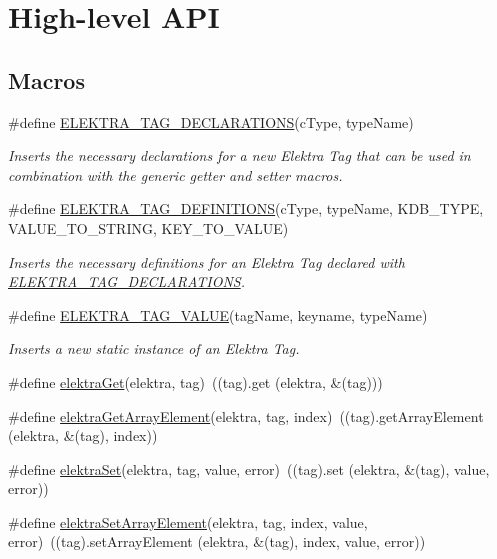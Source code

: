 \hypertarget{group__highlevel}{}\section{High-\/level A\+PI}
\label{group__highlevel}
\subsection*{Macros}
\begin{DoxyCompactItemize}
\item 
\#define \hyperlink{group__highlevel_gad2b8a6e7493d6128d38d9ac68906fb62}{E\+L\+E\+K\+T\+R\+A\+\_\+\+T\+A\+G\+\_\+\+D\+E\+C\+L\+A\+R\+A\+T\+I\+O\+NS}(c\+Type,  type\+Name)
\begin{DoxyCompactList}\small\item\em Inserts the necessary declarations for a new Elektra Tag that can be used in combination with the generic getter and setter macros. \end{DoxyCompactList}\item 
\#define \hyperlink{group__highlevel_ga02481adffa727707a6b0fcf3842b6c95}{E\+L\+E\+K\+T\+R\+A\+\_\+\+T\+A\+G\+\_\+\+D\+E\+F\+I\+N\+I\+T\+I\+O\+NS}(c\+Type,  type\+Name,  K\+D\+B\+\_\+\+T\+Y\+PE,  V\+A\+L\+U\+E\+\_\+\+T\+O\+\_\+\+S\+T\+R\+I\+NG,  K\+E\+Y\+\_\+\+T\+O\+\_\+\+V\+A\+L\+UE)
\begin{DoxyCompactList}\small\item\em Inserts the necessary definitions for an Elektra Tag declared with \hyperlink{group__highlevel_gad2b8a6e7493d6128d38d9ac68906fb62}{E\+L\+E\+K\+T\+R\+A\+\_\+\+T\+A\+G\+\_\+\+D\+E\+C\+L\+A\+R\+A\+T\+I\+O\+NS}. \end{DoxyCompactList}\item 
\#define \hyperlink{group__highlevel_ga59bd52ce1d1067627c32607b8090ce7b}{E\+L\+E\+K\+T\+R\+A\+\_\+\+T\+A\+G\+\_\+\+V\+A\+L\+UE}(tag\+Name,  keyname,  type\+Name)
\begin{DoxyCompactList}\small\item\em Inserts a new static instance of an Elektra Tag. \end{DoxyCompactList}\item 
\#define \hyperlink{group__highlevel_ga69744067c03e64559504d0c7bea63194}{elektra\+Get}(elektra,  tag)~((tag).get (elektra, \&(tag)))
\item 
\#define \hyperlink{group__highlevel_ga147171b168f4bf1ade1e8270a6251865}{elektra\+Get\+Array\+Element}(elektra,  tag,  index)~((tag).get\+Array\+Element (elektra, \&(tag), index))
\item 
\#define \hyperlink{group__highlevel_ga225f1feba939f476b26957a8ac6a5a90}{elektra\+Set}(elektra,  tag,  value,  error)~((tag).set (elektra, \&(tag), value, error))
\item 
\#define \hyperlink{group__highlevel_ga33fde571614229a1f9989ea3bf2b81a0}{elektra\+Set\+Array\+Element}(elektra,  tag,  index,  value,  error)~((tag).set\+Array\+Element (elektra, \&(tag), index, value, error))
\end{DoxyCompactItemize}
